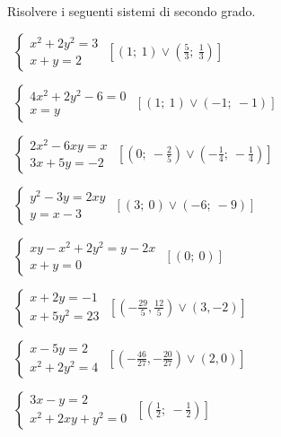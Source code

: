 \begin{esercizio}[\Ast]
 \label{ese:6.1}
Risolvere i seguenti sistemi di secondo grado.
\begin{multicols}{2}
 \begin{enumeratea}
 \item~$\left\{\begin{array}{l}x^2+2y^2=3\\x+y=2\end{array}\right.$
\hfill$\left[\left(1;~1\right) \vee \left(\frac 5 3;~\frac 1 3\right)\right]$
 \item~$\left\{\begin{array}{l}4x^2+2y^2-6=0\\x=y\end{array}\right.$
\hfill$\left[\left(1;~1\right)\vee \left(-1;~-1\right)\right]$
 \item~$\left\{\begin{array}{l}2x^2-6xy=x\\3x+5y=-2\end{array}\right.$
\hfill$\left[\left(0;~-\frac 2 5\right)\vee 
       \left(-\frac 1 4;~-\frac 1 4\right)\right]$
 \item~$\left\{\begin{array}{l}y^2-3y=2xy\\y=x-3\end{array}\right.$
\hfill$\left[\left(3;~0\right)\vee \left(-6;~-9\right)\right]$
 \item~$\left\{\begin{array}{l}xy-x^2+2y^2=y-2x\\x+y=0\end{array}\right.$
\hfill$\left[\left(0;~0\right)\right]$
 \item~$\left\{\begin{array}{l}{x+2y=-1}\\{x+5y^2=23}\end{array}\right.$
\hfill$\left[\left(-\frac{29} 5,\frac{12} 5\right) \vee 
       (3,-2)\right]$
 \item~$\left\{\begin{array}{l}{x-5y=2}\\{x^2+2y^2=4}\end{array}\right.$
\hfill$\left[\left(-\frac{46}{27},-\frac{20}{27}\right)\vee (2,0)\right]$
 \item~$\left\{\begin{array}{l}3x-y=2\\x^2+2xy+y^2=0\end{array}\right.$
\hfill$\left[\left(\frac 1 2;~-\frac 1 2\right)\right]$

\end{enumeratea}
\end{multicols}
\end{esercizio}
